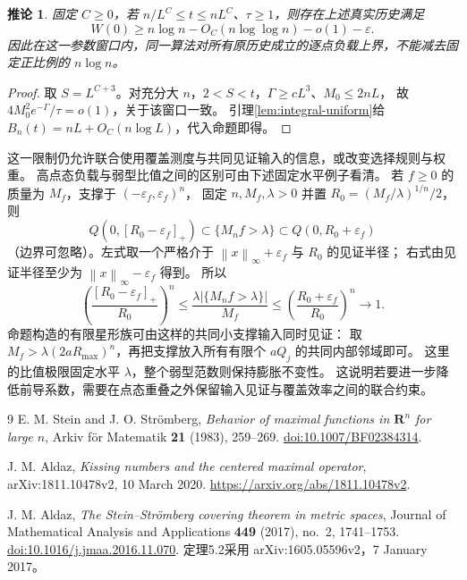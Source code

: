 \documentclass[UTF8,a4paper,11pt,fontset=fandol]{ctexart}
\newtheorem{corollary}[theorem]{推论}
\theoremstyle{remark}
\newcommand{\norm}[1]{\left\lVert#1\right\rVert}
\begin{document}
\begin{corollary}\label{cor:leading-barrier}
固定 $C\ge0$，若 $n/L^C\le t\le nL^C$、$\tau\ge1$，则存在上述真实历史满足
\[
 W(0)\ge n\log n-O_C(n\log\log n)-o(1)-\varepsilon.
\]
因此在这一参数窗口内，同一算法对所有原历史成立的逐点负载上界，不能减去固定正比例的 $n\log n$。
\end{corollary}
\begin{proof}
取 $S=L^{C+3}$。对充分大 $n$，$2<S<t$，$\Gamma\ge cL^3$、$M_0\le2nL$，
故 $4M_0^2e^{-\Gamma}/\tau=o(1)$，关于该窗口一致。
引理\ref{lem:integral-uniform}给 $B_n(t)=nL+O_C(n\log L)$，代入命题即得。
\end{proof}
这一限制仍允许联合使用覆盖测度与共同见证输入的信息，或改变选择规则与权重。
高点态负载与弱型比值之间的区别可由下述固定水平例子看清。
若 $f\ge0$ 的质量为 $M_f$，支撑于 $(-\varepsilon_f,\varepsilon_f)^n$，
固定 $n,M_f,\lambda>0$ 并置 $R_0=(M_f/\lambda)^{1/n}/2$，则
\[
 Q(0,[R_0-\varepsilon_f]_+)\subset\{M_nf>\lambda\}
 \subset Q(0,R_0+\varepsilon_f)
\]
（边界可忽略）。左式取一个严格介于 $\norm x_\infty+\varepsilon_f$ 与 $R_0$ 的见证半径；
右式由见证半径至少为 $\norm x_\infty-\varepsilon_f$ 得到。
所以
\[
 \left(\frac{[R_0-\varepsilon_f]_+}{R_0}\right)^n
 \le\frac{\lambda|\{M_nf>\lambda\}|}{M_f}
 \le\left(\frac{R_0+\varepsilon_f}{R_0}\right)^n\longrightarrow1.
\]
命题构造的有限星形族可由这样的共同小支撑输入同时见证：
取 $M_f>\lambda(2aR_{\max})^n$，再把支撑放入所有有限个 $aQ_j$ 的共同内部邻域即可。
这里的比值极限固定水平 $\lambda$，整个弱型范数则保持膨胀不变性。
这说明若要进一步降低前导系数，需要在点态重叠之外保留输入见证与覆盖效率之间的联合约束。
\begin{thebibliography}{9}
E. M. Stein and J. O. Str\"omberg,
\emph{Behavior of maximal functions in $\mathbf R^n$ for large $n$},
Arkiv f\"or Matematik \textbf{21} (1983), 259--269.
\href{https://doi.org/10.1007/BF02384314}{doi:10.1007/BF02384314}.

J. M. Aldaz,
\emph{Kissing numbers and the centered maximal operator},
arXiv:1811.10478v2, 10 March 2020.
\url{https://arxiv.org/abs/1811.10478v2}.

J. M. Aldaz,
\emph{The Stein--Str\"omberg covering theorem in metric spaces},
Journal of Mathematical Analysis and Applications \textbf{449} (2017), no.~2, 1741--1753.
\href{https://doi.org/10.1016/j.jmaa.2016.11.070}{doi:10.1016/j.jmaa.2016.11.070}.
定理5.2采用 arXiv:1605.05596v2，7 January 2017。

\end{thebibliography}
\end{document}
